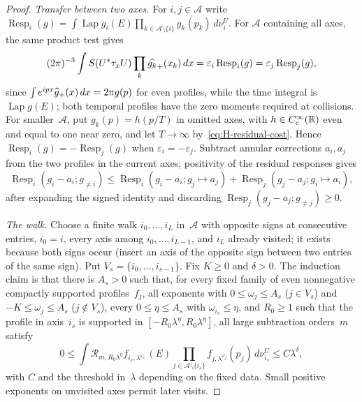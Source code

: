 \begin{proof}
\emph{Transfer between two axes.} For $i,j\in\mathcal A$ write $\operatorname{Resp}_i(g)=\int\operatorname{Lap}g_i(E)\prod_{k\in\mathcal A\setminus\{i\}}g_k(p_k)\,d\nu_i^U$. For $\mathcal A$ containing all axes, the same product test gives
\begin{equation*}
(2\pi)^{-3}\int S(U^*\tau_xU)\prod_k\widehat{g_k}_{+}(x_k)\,dx
=\varepsilon_i\operatorname{Resp}_i(g)=\varepsilon_j\operatorname{Resp}_j(g),
\end{equation*}
since $\int e^{ipx}\widehat{g}_{+}(x)\,dx=2\pi g(p)$ for even profiles, while the time integral is $\operatorname{Lap}g(E)$; both temporal profiles have the zero moments required at collisions. For smaller~$\mathcal A$, put $g_k(p)=h(p/T)$ in omitted axes, with $h\in C_c^\infty(\mathbb{R})$ even and equal to one near zero, and let $T\to\infty$ by~\eqref{eq:H-residual-cost}. Hence $\operatorname{Resp}_i(g)=-\operatorname{Resp}_j(g)$ when $\varepsilon_i=-\varepsilon_j$. Subtract annular corrections $a_i,a_j$ from the two profiles in the current axes; positivity of the residual responses gives
\begin{equation}\label{eq:H-sign-transfer}
\operatorname{Resp}_i(g_i-a_i;g_{\ne i})\le
\operatorname{Resp}_i(g_i-a_i;g_j\mapsto a_j)+\operatorname{Resp}_j(g_j-a_j;g_i\mapsto a_i),
\end{equation}
after expanding the signed identity and discarding $\operatorname{Resp}_j(g_j-a_j;g_{\ne j})\ge0$.

\emph{The walk.} Choose a finite walk $i_0,\ldots,i_L$ in~$\mathcal A$ with opposite signs at consecutive entries, $i_0=i$, every axis among $i_0,\ldots,i_{L-1}$, and $i_L$ already visited; it exists because both signs occur (insert an axis of the opposite sign between two entries of the same sign). Put $V_s=\{i_0,\ldots,i_{s-1}\}$. Fix $K\ge0$ and $\delta>0$. The induction claim is that there is $A_s>0$ such that, for every fixed family of even nonnegative compactly supported profiles~$f_j$, all exponents with $0\le\omega_j\le A_s$ ($j\in V_s$) and $-K\le\omega_j\le A_s$ ($j\notin V_s$), every $0\le\eta\le A_s$ with $\omega_{i_s}\le\eta$, and $R_0\ge1$ such that the profile in axis~$i_s$ is supported in $[-R_0\lambda^\eta,R_0\lambda^\eta]$, all large subtraction orders~$m$ satisfy
\begin{equation*}\tag{$\mathrm H_s$}\label{eq:H-sign-induction}
0\le\int\mathcal R_{m,R_0\lambda^\eta}f_{i_s,\lambda^{\omega_{i_s}}}(E)
\prod_{j\in\mathcal A\setminus\{i_s\}}f_{j,\lambda^{\omega_j}}(p_j)\,d\nu_{i_s}^U
\le C\lambda^\delta,
\end{equation*}
with $C$ and the threshold in~$\lambda$ depending on the fixed data. Small positive exponents on unvisited axes permit later visits.


\end{proof}
